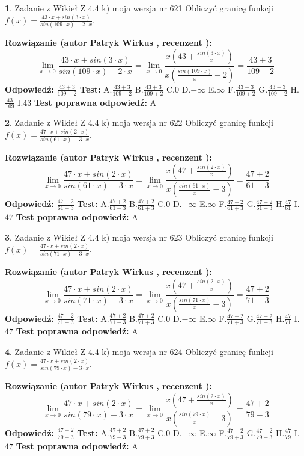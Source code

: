 \documentclass[12pt, a4paper]{article}
\theoremstyle{definition} %
\newtheorem{zad}{}
\newcommand{\zadStart}[1]{\begin{zad}#1\newline}
\newcommand{\zadStop}{\end{zad}}
\newcommand{\rozwStart}[2]{\noindent \textbf{Rozwiązanie (autor #1 , recenzent #2): }\newline}
\newcommand{\rozwStop}{\newline}
\newcommand{\odpStart}{\noindent \textbf{Odpowiedź:}\newline}
\newcommand{\odpStop}{\newline}
\newcommand{\testStart}{\noindent \textbf{Test:}\newline}
\newcommand{\testStop}{\newline}
\newcommand{\kluczStart}{\noindent \textbf{Test poprawna odpowiedź:}\newline}
\newcommand{\kluczStop}{\newline}
\begin{document}
\zadStart{Zadanie z Wikieł Z 4.4 k) moja wersja nr 621}
Obliczyć granicę funkcji $f(x)=\frac{43\cdot x +sin(3\cdot x)}{sin(109\cdot x) -2\cdot x}$.
\zadStop
\rozwStart{Patryk Wirkus}{}
$$\lim\limits_{x\to 0}\frac{43\cdot x +sin(3\cdot x)}{sin(109\cdot x) -2\cdot x}
=\lim\limits_{x\to 0}\frac{x(43+\frac{sin(3\cdot x)}{x})}{x(\frac{sin(109\cdot x)}{x}-2)}
=\frac{43+3}{109-2}$$
\rozwStop
\odpStart
$\frac{43+3}{109-2}$
\odpStop
\testStart
A.$\frac{43+3}{109-2}$
B.$\frac{43+3}{109+2}$
C.$0$
D.$-\infty$
E.$\infty$
F.$\frac{43-3}{109+2}$
G.$\frac{43-3}{109-2}$
H.$\frac{43}{109}$
I.$43$
\testStop
\kluczStart
A
\kluczStop



\zadStart{Zadanie z Wikieł Z 4.4 k) moja wersja nr 622}
Obliczyć granicę funkcji $f(x)=\frac{47\cdot x +sin(2\cdot x)}{sin(61\cdot x) -3\cdot x}$.
\zadStop
\rozwStart{Patryk Wirkus}{}
$$\lim\limits_{x\to 0}\frac{47\cdot x +sin(2\cdot x)}{sin(61\cdot x) -3\cdot x}
=\lim\limits_{x\to 0}\frac{x(47+\frac{sin(2\cdot x)}{x})}{x(\frac{sin(61\cdot x)}{x}-3)}
=\frac{47+2}{61-3}$$
\rozwStop
\odpStart
$\frac{47+2}{61-3}$
\odpStop
\testStart
A.$\frac{47+2}{61-3}$
B.$\frac{47+2}{61+3}$
C.$0$
D.$-\infty$
E.$\infty$
F.$\frac{47-2}{61+3}$
G.$\frac{47-2}{61-3}$
H.$\frac{47}{61}$
I.$47$
\testStop
\kluczStart
A
\kluczStop



\zadStart{Zadanie z Wikieł Z 4.4 k) moja wersja nr 623}
Obliczyć granicę funkcji $f(x)=\frac{47\cdot x +sin(2\cdot x)}{sin(71\cdot x) -3\cdot x}$.
\zadStop
\rozwStart{Patryk Wirkus}{}
$$\lim\limits_{x\to 0}\frac{47\cdot x +sin(2\cdot x)}{sin(71\cdot x) -3\cdot x}
=\lim\limits_{x\to 0}\frac{x(47+\frac{sin(2\cdot x)}{x})}{x(\frac{sin(71\cdot x)}{x}-3)}
=\frac{47+2}{71-3}$$
\rozwStop
\odpStart
$\frac{47+2}{71-3}$
\odpStop
\testStart
A.$\frac{47+2}{71-3}$
B.$\frac{47+2}{71+3}$
C.$0$
D.$-\infty$
E.$\infty$
F.$\frac{47-2}{71+3}$
G.$\frac{47-2}{71-3}$
H.$\frac{47}{71}$
I.$47$
\testStop
\kluczStart
A
\kluczStop



\zadStart{Zadanie z Wikieł Z 4.4 k) moja wersja nr 624}
Obliczyć granicę funkcji $f(x)=\frac{47\cdot x +sin(2\cdot x)}{sin(79\cdot x) -3\cdot x}$.
\zadStop
\rozwStart{Patryk Wirkus}{}
$$\lim\limits_{x\to 0}\frac{47\cdot x +sin(2\cdot x)}{sin(79\cdot x) -3\cdot x}
=\lim\limits_{x\to 0}\frac{x(47+\frac{sin(2\cdot x)}{x})}{x(\frac{sin(79\cdot x)}{x}-3)}
=\frac{47+2}{79-3}$$
\rozwStop
\odpStart
$\frac{47+2}{79-3}$
\odpStop
\testStart
A.$\frac{47+2}{79-3}$
B.$\frac{47+2}{79+3}$
C.$0$
D.$-\infty$
E.$\infty$
F.$\frac{47-2}{79+3}$
G.$\frac{47-2}{79-3}$
H.$\frac{47}{79}$
I.$47$
\testStop
\kluczStart
A
\kluczStop
\end{document}
